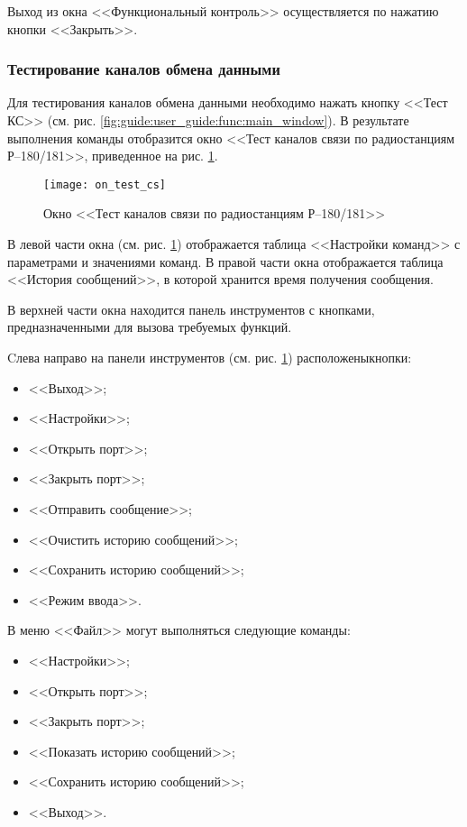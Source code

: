 Выход из окна <<Функциональный контроль>> осуществляется по нажатию кнопки <<Закрыть>>.

\subsubsection{Тестирование каналов обмена данными}
\label{sub:guide:user_guide:radio}

Для тестирования каналов обмена данными необходимо нажать кнопку <<Тест КС>> (см. рис.
\ref{fig:guide:user_guide:func:main_window}).
В результате выполнения команды отобразится окно <<Тест каналов связи по радиостанциям Р–180/181>>, приведенное на рис.
\ref{fig:guide:user_guide:radio:on_test_cs}.
\begin{figure}[htb]
	\centering
	\texttt{[image: on\_test\_cs]}
	\caption{Окно <<Тест каналов связи по радиостанциям Р–180/181>>}
	\label{fig:guide:user_guide:radio:on_test_cs}
\end{figure}
В левой части окна (см. рис. \ref{fig:guide:user_guide:radio:on_test_cs}) отображается таблица <<Настройки команд>> с параметрами и значениями команд.
В правой части окна отображается таблица <<История сообщений>>, в которой хранится время получения сообщения.

В верхней части окна находится панель инструментов с кнопками, предназначенными для вызова требуемых функций.

Cлева направо на панели инструментов (см. рис. \ref{fig:guide:user_guide:radio:on_test_cs}) расположены\break кнопки:
\begin{itemize}
	\item <<Выход>>;
	\item <<Настройки>>;
	\item <<Открыть порт>>;
	\item <<Закрыть порт>>;
	\item <<Отправить сообщение>>;
	\item <<Очистить историю сообщений>>;
	\item <<Сохранить историю сообщений>>;
	\item <<Режим ввода>>.
\end{itemize}

В меню <<Файл>> могут выполняться следующие команды:
\begin{itemize}
	\item <<Настройки>>;
	\item <<Открыть порт>>;
	\item <<Закрыть порт>>;
	\item <<Показать историю сообщений>>;
	\item <<Сохранить историю сообщений>>;
	\item <<Выход>>.
\end{itemize}

